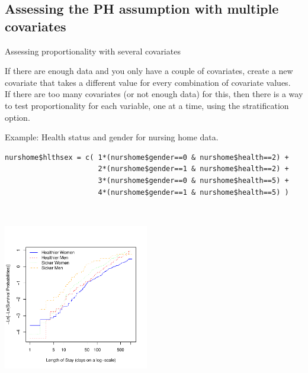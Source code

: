 \documentclass[envcountsect, 10pt, portrait, palatino]{beamer}
\begin{document}
\subsection{Assessing the PH assumption with multiple covariates}
\begin{frame}{Assessing proportionality with several covariates}

If there are enough data and you only have a couple of
covariates, create a new covariate that takes a different value for
every combination of covariate values.
\\[2ex]
If there are too many covariates (or not enough data) for
this, then there is a way to test proportionality for
each variable, one at a time, using the stratification option.
\end{frame}
\begin{frame}[fragile]{ Example: Health status and gender for nursing home data.}

\scriptsize
\begin{verbatim}
nurshome$hlthsex = c( 1*(nurshome$gender==0 & nurshome$health==2) +
                      2*(nurshome$gender==1 & nurshome$health==2) +
                      3*(nurshome$gender==0 & nurshome$health==5) +
                      4*(nurshome$gender==1 & nurshome$health==5) )
\end{verbatim}
~\\[-2ex]
\vspace*{-.25in}
\centerline{\includegraphics[width=2.5in]{ch12ph_hlthsex.pdf}}
\normalsize
\end{frame}
\end{document}
